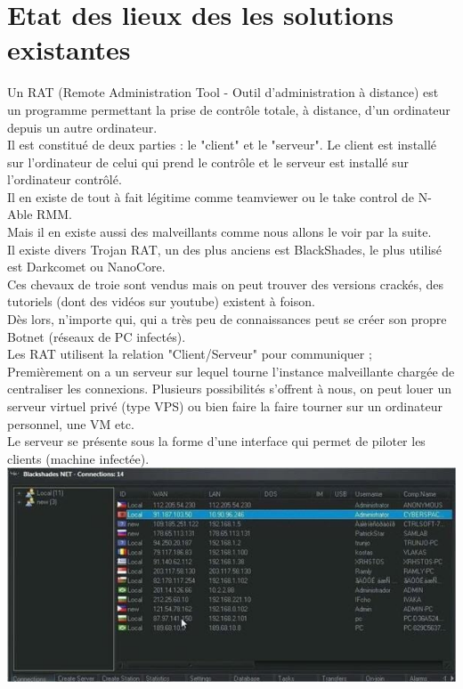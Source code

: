 \documentclass[a4paper]{article}
\begin{document}
\section{Etat des lieux des les solutions existantes}
Un RAT (Remote Administration Tool - Outil d'administration à distance) est un programme permettant la prise de contrôle totale, à distance, d'un ordinateur depuis un autre ordinateur.\\
Il est constitué de deux parties : le "client" et le "serveur". Le client est installé sur l'ordinateur de celui qui prend le contrôle et le serveur est installé sur l'ordinateur contrôlé.
\bigskip
\\
Il en existe de tout à fait légitime comme teamviewer ou le take control de N-Able RMM.\\
Mais il en existe aussi des malveillants comme nous allons le voir par la suite.
\bigskip
\\
Il existe divers Trojan RAT, un des plus anciens est BlackShades, le plus utilisé est Darkcomet ou NanoCore.\\
Ces chevaux de troie sont vendus mais on peut trouver des versions crackés, des tutoriels (dont des vidéos sur youtube) existent à foison.\\
Dès lors, n'importe qui, qui a très peu de connaissances peut se créer son propre Botnet (réseaux de PC infectés).
\bigskip
\\
Les RAT utilisent la relation "Client/Serveur" pour communiquer ;
\bigskip
\\
Premièrement on a un serveur sur lequel tourne l'instance malveillante chargée de centraliser les connexions. Plusieurs possibilités s'offrent à nous, on peut louer un serveur virtuel privé (type VPS) ou bien faire la faire tourner sur un ordinateur personnel, une VM etc.\\
Le serveur se présente sous la forme d'une interface qui permet de piloter les clients (machine infectée).\\
\includegraphics[scale=.5]{blackshades.jpeg}
\bigskip
\end{document}
